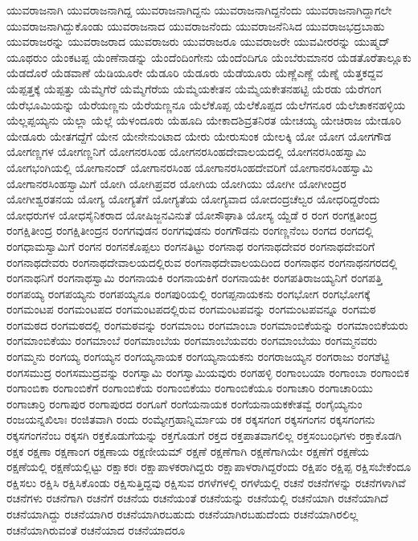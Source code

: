 {ಯುವರಾಜನಾಗಿ
ಯುವರಾಜನಾಗಿದ್ದ
ಯುವರಾಜನಾಗಿದ್ದನು
ಯುವರಾಜನಾಗಿದ್ದನೆಂದು
ಯುವರಾಜನಾಗಿದ್ದಾಗಲೇ
ಯುವರಾಜನಾಗಿದ್ದುಕೊಂಡು
ಯುವರಾಜನಾದ
ಯುವರಾಜನೆಂದು
ಯುವರಾಜನೆನಿಸಿದ
ಯುವರಾಜಭದ್ರಬಾಹು
ಯುವರಾಜರನ್ನು
ಯುವರಾಜರಾದ
ಯುವರಾಜರು
ಯುವರಾಜರೂ
ಯುವರಾಜರೇ
ಯುವವೀರರನ್ನು
ಯುಷ್ಮದ್
ಯೂಥರುಂ
ಯೆಂಕಟಪ್ಪ
ಯೆಂಣೆನಾಡನ್ನು
ಯೆಂದೆಂದಿಂಗೇನು
ಯೆಂದೆಂದಿಗೂ
ಯೆಂಬೆರುಮಾನರ
ಯೆಡತೊರೆತಾಲ್ಲೂಕು
ಯೆಡದೊರೆ
ಯೆಡವಾಣೆ
ಯೆಡಿಯೂರೇ
ಯೆಡೂರಿ
ಯೆಡೂರು
ಯೆಡೆಯೂರು
ಯೆಣ್ಣೆಎಣ್ಣೆ
ಯೆಣ್ನೆ
ಯೆತ್ತಕದ್ದವ
ಯೆಪ್ಪತ್ತಕ್ಕೆ
ಯೆಪ್ಪತ್ತು
ಯೆಮ್ಮೆಗೆರೆ
ಯೆಮ್ಮೆಗೆರೆಯ
ಯೆಮ್ಮೆಯಕೇತನ
ಯೆಮ್ಮೆಯಕೇತನಹಟ್ಟಿ
ಯೆರಡು
ಯೆರೆಗಂಗ
ಯೆರೆಭೂಮಿಯನ್ನು
ಯೆರೆಯಣ್ಣನು
ಯೆರೆಯಣ್ಣನೂ
ಯೆಲೆಕೊಪ್ಪ
ಯೆಲೆಕೊಪ್ಪದ
ಯೆಲೆಗನೂರ
ಯೆಲೆಚಾಕನಹಳ್ಳಿಯ
ಯೆಲ್ಲಪ್ಪಯ್ಯನು
ಯೆಲ್ಲಾ
ಯೆಲ್ಲೆ
ಯೆಳಂದೂರು
ಯೆಹೂದಿ
ಯೇಕಾದಶಿವ್ರತನಿರತ
ಯೇಚಯ್ಯ
ಯೇಚಿರಾಜ
ಯೇಡೂರಿ
ಯೇಡೂರು
ಯೇತಗದ್ದೆಗೆ
ಯೇನ
ಯೇನೇನುಂಟಾದ
ಯೇರು
ಯೇರುಸುಂಕ
ಯೇಲಕ್ಕಿ
ಯೋ
ಯೋಗ
ಯೋಗಗೌಡ
ಯೋಗಣ್ಣಗಳ
ಯೋಗಣ್ಣನಿಗೆ
ಯೋಗನರಸಿಂಹ
ಯೋಗನರಸಿಂಹದೇವಾಲಯದಲ್ಲಿ
ಯೋಗನರಸಿಂಹಸ್ವಾಮಿ
ಯೋಗಭಂಗಿಯಲ್ಲಿ
ಯೋಗಾನಂದ್
ಯೋಗಾನರಸಿಂಹ
ಯೋಗಾನರಸಿಂಹದೇವರಿಗೆ
ಯೋಗಾನರಸಿಂಹಸ್ವಾಮಿ
ಯೋಗಾನರಸಿಂಹಸ್ವಾಮಿಗೆ
ಯೋಗಿ
ಯೋಗಿಪ್ರವರ
ಯೋಗಿಯ
ಯೋಗಿಯು
ಯೋಗೀ
ಯೋಗೀಂದ್ರರ
ಯೋಗೀಶ್ವರತನಯ
ಯೋಗ್ಯ
ಯೋಗ್ಯತೆಗೆ
ಯೋಗ್ಯತೆಯ
ಯೋಗ್ಯವಾದ
ಯೋದಂದ್ರಚೆಲ್ವರ
ಯೋಧರಿದ್ದರೆಂದು
ಯೋಧರುಗಳ
ಯೋಧಸೈನಿಕರಾದ
ಯೋಷಿಜ್ಜನವಿನುತೆ
ಯೋಸೌಘಾತಿ
ಯೋಸ್ಯ
ಯ್ದೆಡೆ
ರ
ರಂಗ
ರಂಗಕ್ಷತೀಂದ್ರ
ರಂಗಕ್ಷಿತೀಂದ್ರ
ರಂಗಕ್ಷಿತೀಂದ್ರನ
ರಂಗಗವುಡನ
ರಂಗಗವುಡನು
ರಂಗಗೌಡನು
ರಂಗಣ್ಣನೆಂಬ
ರಂಗದ
ರಂಗದಲ್ಲಿ
ರಂಗಧಾಮಸ್ವಾಮಿಗೆ
ರಂಗನ
ರಂಗನಕೊಪ್ಪಲು
ರಂಗನತಿಟ್ಟು
ರಂಗನಾಥ
ರಂಗನಾಥದೇವರ
ರಂಗನಾಥದೇವರಿಗೆ
ರಂಗನಾಥದೇವರು
ರಂಗನಾಥದೇವಾಲಯದಲ್ಲಿರುವ
ರಂಗನಾಥದೇವಾಲಯದಿಂದ
ರಂಗನಾಥನ
ರಂಗನಾಥನಗರದಲ್ಲಿ
ರಂಗನಾಥನಿಗೆ
ರಂಗನಾಥಸ್ವಾಮಿ
ರಂಗನಾಯಕಿ
ರಂಗನಾಯಕಿಗೆ
ರಂಗನಾಯಕೀ
ರಂಗಪತಿರಾಜಯ್ಯನಿಗೆ
ರಂಗಪತ್ತಿ
ರಂಗಪಯ್ಯ
ರಂಗಪಯ್ಯನು
ರಂಗಪಯ್ಯನೂ
ರಂಗಪುರಿಯಲ್ಲಿ
ರಂಗಪ್ಪನಾಯಕನು
ರಂಗಭೋಗ
ರಂಗಭೋಗಕ್ಕೆ
ರಂಗಮಂಟಪ
ರಂಗಮಂಟಪದ
ರಂಗಮಂಟಪದಲ್ಲಿರುವ
ರಂಗಮಂಟಪವನ್ನು
ರಂಗಮಂಟಪವನ್ನೂ
ರಂಗಮಠ
ರಂಗಮಠದ
ರಂಗಮಠದಲ್ಲಿ
ರಂಗಮಠವನ್ನು
ರಂಗಮಾಂಬ
ರಂಗಮಾಂಬಾ
ರಂಗಮಾಂಬಿಕೆಯನ್ನು
ರಂಗಮಾಂಬಿಕೆಯರು
ರಂಗಮಾಂಬಿಕೆಯು
ರಂಗಮಾಂಬೆ
ರಂಗಮಾಂಬೆಯ
ರಂಗಮಾಂಬೆಯವರು
ರಂಗಮಾಂಬೆಯು
ರಂಗಮ್ಮನವರು
ರಂಗಮ್ಮನು
ರಂಗಯ್ಯ
ರಂಗಯ್ಯನ
ರಂಗಯ್ಯನಾಯಕ
ರಂಗಯ್ಯನಾಯಕನು
ರಂಗರಾಜಯ್ಯನ
ರಂಗರಾಜು
ರಂಗಶೆಟ್ಟಿ
ರಂಗಸಮುದ್ರ
ರಂಗಸಮುದ್ರವನ್ನು
ರಂಗಸ್ವಾಮಿ
ರಂಗಸ್ವಾಮಿಯವುರು
ರಂಗಹಳ್ಳಿ
ರಂಗಾಂಬಯಾ
ರಂಗಾಂಬಾ
ರಂಗಾಂಬಿಕ
ರಂಗಾಂಬಿಕಾ
ರಂಗಾಂಬಿಕೆಗೆ
ರಂಗಾಂಬಿಕೆಯ
ರಂಗಾಂಬಿಕೆಯು
ರಂಗಾಂಬಿಕೆಯೂ
ರಂಗಾಚಾರಿ
ರಂಗಾಚಾರಿಯು
ರಂಗಾಚಾರ್ರಿ
ರಂಗಾಪುರ
ರಂಗಾಪುರದ
ರಂಗೂಗೆ
ರಂಗೆಯನಾಯಕ
ರಂಗೆಯನಾಯಕಕೇತವ್ವೆ
ರಂಗೈಯ್ಯನುಂ
ರಂಜಯನ್ನಖಿಲಾಃ
ರಂಜಿತವಾಗಿ
ರಂದು
ರಂಮ್ಯೇಗ್ರಹಾನ್ನಿರ್ಮಾಯ
ರಕ
ರಕ್ಕಸಗಂಗ
ರಕ್ಕಸಗಂಗನ
ರಕ್ಕಸಗಂಗನು
ರಕ್ಕಸಗಂಗನೆಂಬ
ರಕ್ಕಸಗಿ
ರಕ್ತಕೊಡುಗೆಯನ್ನು
ರಕ್ತಗೊಡುಗೆ
ರಕ್ತದ
ರಕ್ತಪಾತವಾಗಲಿಲ್ಲ
ರಕ್ತಸಂಬಂಧಿಗಳು
ರಕ್ತಾಕೊಡಗಿ
ರಕ್ಷಕ
ರಕ್ಷಣಾ
ರಕ್ಷಣಾಂಗ
ರಕ್ಷಣಾಯ
ರಕ್ಷಣೀಯಮ್
ರಕ್ಷಣೆ
ರಕ್ಷಣೆಗಾಗಿ
ರಕ್ಷಣೆಗಾಗಿಯೇ
ರಕ್ಷಣೆಗೆ
ರಕ್ಷಣೆಯ
ರಕ್ಷಣೆಯಲ್ಲಿ
ರಕ್ಷಣೆಯಲ್ಲಿಟ್ಟು
ರಕ್ಷಾಕರಃ
ರಕ್ಷಾಪಾಳಕರಾಗಿದ್ದರು
ರಕ್ಷಾಪಾಳರಾಗಿದ್ದರೆಂದು
ರಕ್ಷಿಪಂ
ರಕ್ಷಿಪ್ಪ
ರಕ್ಷಿಸಬೇಕೆಂದೂ
ರಕ್ಷಿಸಲು
ರಕ್ಷಿಸಿ
ರಕ್ಷಿಸಿಕೊಂಡು
ರಕ್ಷಿಸುತ್ತಿದ್ದವು
ರಕ್ಷಿಸುವ
ರಗಳೆಗಳಲ್ಲಿ
ರಗಳೆಯಲ್ಲಿ
ರಚನೆ
ರಚನೆಗಳನ್ನು
ರಚನೆಗಳಾಗಿವೆ
ರಚನೆಗಳು
ರಚನೆಗಾಗಿ
ರಚನೆಗೆ
ರಚನೆಯ
ರಚನೆಯಂತೆ
ರಚನೆಯನ್ನು
ರಚನೆಯಲ್ಲಿ
ರಚನೆಯಾಗಿ
ರಚನೆಯಾಗಿದೆ
ರಚನೆಯಾಗಿದ್ದು
ರಚನೆಯಾಗಿರ
ರಚನೆಯಾಗಿರಬಹುದು
ರಚನೆಯಾಗಿರಬಹುದೆಂದು
ರಚನೆಯಾಗಿರಲಿಲ್ಲ
ರಚನೆಯಾಗಿರುವಂತೆ
ರಚನೆಯಾದ
ರಚನೆಯಾದರೂ
}
